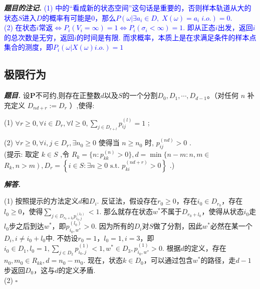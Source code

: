 \documentclass[10pt, a4paper, oneside]{ctexart}
\newenvironment{problem}{\begin{framed}\par\noindent\textbf{\textit{题目. }}}{\end{framed}\par}
\newenvironment{solution}{%
  \par\noindent\textbf{\textit{解答. }}\ignorespaces
}{%
  \hfill\ensuremath{\square}\par %
}
\newenvironment{note}{\par\noindent\textbf{\textit{题目的注记. }}\ignorespaces}{\par}
\begin{document}
\begin{note}
\textcolor{blue}{(1) 中的“看成新的状态空间”这句话是重要的，否则样本轨道从大的状态$S$进入$D$的概率有可能是$0$，那么$P(\omega| \exists a_i \in D, \; X(\omega)=a_i\; i.o.)=0$.\\(2) 在状态$i$常返$\iff P_i(V_i=\infty)=1\iff P_i(\sigma_i<\infty)=1$. 即从正态$i$出发，返回$i$的总次数是无穷，返回$i$的时间是有限. 而求概率，本质上是在求满足条件的样本点集合的测度，即$P_i(\omega|X(\omega) i.o.)=1$}
\end{note}
\subsection{极限行为}
\begin{problem}设$\mathbf{P}$不可约,则存在正整数$d$以及$S$的一个分割${D}_{0},{D}_{1},\cdots,{D}_{d - 1}$。（对任何 $n$ 补充定义 ${{D}_{{nd} + r} \mathrel{\text{:=}} {D}_{r}}$ ）,使得:

(1) $\forall r \geq 0,\forall i \in {D}_{r},\forall l \geq 0,{\sum }_{j \in {D}_{r + l}}{p}_{ij}^{\left( l\right) } = 1$ ;

(2) $\forall r \geq 0,\forall i,j \in {D}_{r},\exists {n}_{0} \geq 0$ 使得当 $n \geq {n}_{0}$ 时, ${p}_{ij}^{\left( nd\right) } > 0$ .\\
(提示: 取定 \( k \in S \) ,令 \( {R}_{k} = \{ n : {p}_{kk}^{\left( n\right) } > 0\} ,d = \min \{ n - m : n,m \in \) \( \left. {{R}_{k},n > m}\right) ,{D}_{r} = \left\{ {i \in S : \exists n \geq 0\text{ s.t. }{p}_{ki}^{\left( nd + r\right) } > 0}\right\} \) .)
\end{problem}
\begin{solution}
(1) 按照提示的方法定义$d$和$D_i$. 反证法，假设存在$r_0\geq0$，存在$i_0\in D_{r_0}$，存在$l_0\geq 0$，使得$\sum_{j\in D_{r_0+l_0}p_{i_0,j}^{(l_0)}}<1$. 那么就存在状态$w^*$不属于$D_{r_0+l_0}$，使得从状态$i_0$走$l_0$步之后到达$w^*$，即$p_{i_0,w^*}^{(l_0)}>0$. 因为所有的$D_i$对$S$做了分割，因此$w^*$必然在某一个$D_i,i\neq i_0+l_0$中. 不妨设$r_0=1$，$l_0=1,i=3$，即$i_0\in D_1, l_0=1, \sum_{j\in D_2}p_{i_0,j}^{(1)}<1, w^*\in D_3,p_{i_0,w^*}^{(1)}>0$. 根据$d$的定义，存在$n_0,m_0\in R_{kk},d=n_0-m_0$. 现在，状态$k\in D_0$，可以通过包含$w^*$的路径，走$d-1$步返回$D_0$，这与$d$的定义矛盾.\\
(2) 
\end{solution}
\end{document}
